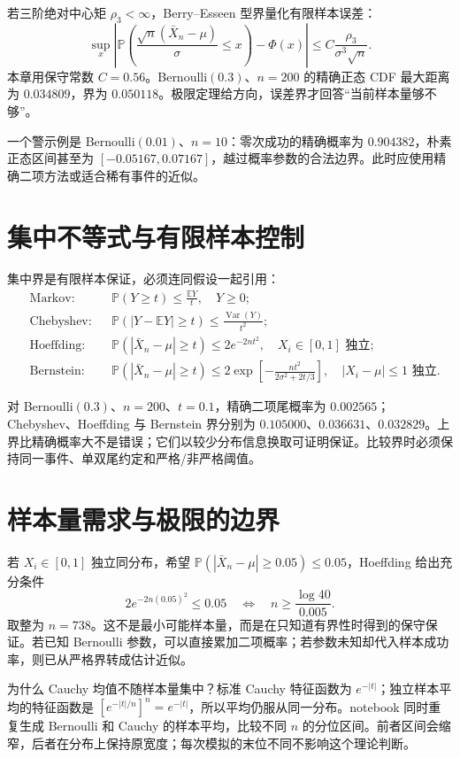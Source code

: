 若三阶绝对中心矩 $\rho_3<\infty$，Berry--Esseen 型界量化有限样本误差：
\[
 \sup_x\left|\mathbb P\!\left(
 \frac{\sqrt n(\bar X_n-\mu)}{\sigma}\le x\right)-\Phi(x)\right|
 \le C\frac{\rho_3}{\sigma^3\sqrt n}.
\]
本章用保守常数 $C=0.56$。Bernoulli$(0.3)$、$n=200$ 的精确正态 CDF 最大距离为 $0.034809$，界为 $0.050118$。极限定理给方向，误差界才回答“当前样本量够不够”。

一个警示例是 Bernoulli$(0.01)$、$n=10$：零次成功的精确概率为 $0.904382$，朴素正态区间甚至为 $[-0.05167,0.07167]$，越过概率参数的合法边界。此时应使用精确二项方法或适合稀有事件的近似。

\section{集中不等式与有限样本控制}

集中界是有限样本保证，必须连同假设一起引用：
\begin{align*}
 &\text{Markov:}&&
 \mathbb P(Y\ge t)\le\frac{\mathbb EY}{t},\quad Y\ge0;\\
 &\text{Chebyshev:}&&
 \mathbb P(|Y-\mathbb EY|\ge t)\le\frac{\operatorname{Var}(Y)}{t^2};\\
 &\text{Hoeffding:}&&
 \mathbb P(|\bar X_n-\mu|\ge t)\le2e^{-2nt^2},
 \quad X_i\in[0,1]\text{ 独立};\\
 &\text{Bernstein:}&&
 \mathbb P(|\bar X_n-\mu|\ge t)
 \le2\exp\!\left[-\frac{nt^2}{2\sigma^2+2t/3}\right],
 \quad |X_i-\mu|\le1\text{ 独立}.
\end{align*}

对 Bernoulli$(0.3)$、$n=200$、$t=0.1$，精确二项尾概率为 $0.002565$；Chebyshev、Hoeffding 与 Bernstein 界分别为 $0.105000$、$0.036631$、$0.032829$。上界比精确概率大不是错误；它们以较少分布信息换取可证明保证。比较界时必须保持同一事件、单双尾约定和严格/非严格阈值。

\section{样本量需求与极限的边界}
若 $X_i\in[0,1]$ 独立同分布，希望 $\mathbb P(|\bar X_n-\mu|\geq0.05)\leq0.05$，Hoeffding 给出充分条件
\[
 2e^{-2n(0.05)^2}\leq0.05
 \quad\Longleftrightarrow\quad n\geq\frac{\log40}{0.005}.
\]
取整为 $n=738$。这不是最小可能样本量，而是在只知道有界性时得到的保守保证。若已知 Bernoulli 参数，可以直接累加二项概率；若参数未知却代入样本成功率，则已从严格界转成估计近似。

为什么 Cauchy 均值不随样本量集中？标准 Cauchy 特征函数为 $e^{-|t|}$；独立样本平均的特征函数是 $[e^{-|t|/n}]^n=e^{-|t|}$，所以平均仍服从同一分布。notebook 同时重复生成 Bernoulli 和 Cauchy 的样本平均，比较不同 $n$ 的分位区间。前者区间会缩窄，后者在分布上保持原宽度；每次模拟的末位不同不影响这个理论判断。


